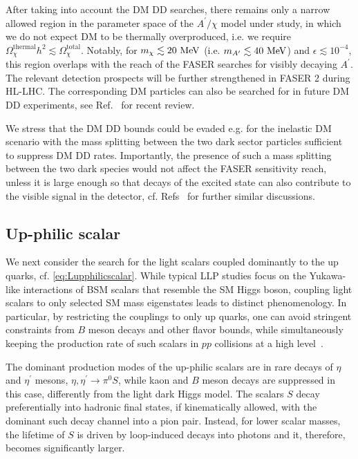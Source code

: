 \documentclass[prd,twocolumn,reprint,preprintnumbers,nofootinbib]{revtex4-1}
\begin{document}
After taking into account the DM DD searches, there remains only a narrow allowed region in the parameter space of the $A^\prime/\chi$ model under study, in which we do not expect DM to be thermally overproduced, i.e. we require $\Omega_\chi^{\textrm{thermal}} h^2\lesssim \Omega_\chi^{\textrm{total}}$. Notably, for $m_\chi\lesssim 20~\text{MeV}$ (i.e. $m_{A^\prime}\lesssim 40~\text{MeV}$) and $\epsilon\lesssim 10^{-4}$, this region overlaps with the reach of the FASER searches for visibly decaying $A^\prime$. The relevant detection prospects will be further strengthened in FASER 2 during HL-LHC. The corresponding DM particles can also be searched for in future DM DD experiments, see Ref.~\cite{Billard:2021uyg} for recent review. 

We stress that the DM DD bounds could be evaded e.g. for the inelastic DM scenario with the mass splitting between the two dark sector particles sufficient to suppress DM DD rates. Importantly, the presence of such a mass splitting between the two dark species would not affect the FASER sensitivity reach, unless it is large enough so that decays of the excited state can also contribute to the visible signal in the detector, cf. Refs~\cite{Berlin:2018jbm,Jodlowski:2019ycu} for further similar discussions. 

\subsection{Up-philic scalar}
\label{sec:upphilicscalar} 
 
We next consider the search for the light scalars coupled dominantly to the up quarks, cf. \cref{eq:Lupphilicscalar}. While typical LLP studies focus on the Yukawa-like interactions of BSM scalars that resemble the SM Higgs boson, coupling light scalars to only selected SM mass eigenstates leads to distinct phenomenology. In particular, by restricting the couplings to only up quarks, one can avoid stringent constraints from $B$ meson decays and other flavor bounds, while simultaneously keeping the production rate of such scalars in $pp$ collisions at a high level~\cite{Batell:2017kty,Batell:2018fqo}.

The dominant production modes of the up-philic scalars are in rare decays of $\eta$ and $\eta^\prime$ mesons, $\eta,\eta^\prime\to\pi^0 S$, while kaon and $B$ meson decays are suppressed in this case, differently from the light dark Higgs model. The scalars $S$ decay preferentially into hadronic final states, if kinematically allowed, with the dominant such decay channel into a pion pair. Instead, for lower scalar masses, the lifetime of $S$ is driven by loop-induced decays into photons and it, therefore, becomes significantly larger.
\end{document}
